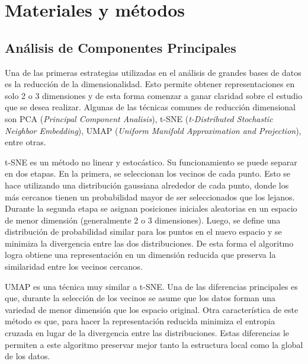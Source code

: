 \chapter{Materiales y métodos}
\label{cap1}
\section{Análisis de Componentes Principales}
\label{c11}
\onehalfspacing

Una de las primeras estrategias utilizadas en el análisis de grandes bases de datos es la reducción de la dimensionalidad. Esto permite obtener representaciones en solo 2 o 3 dimensiones y de esta forma comenzar a ganar claridad sobre el estudio que se desea realizar. Algunas de las técnicas comunes de reducción dimensional son PCA (\textit{Principal Component Analisis}), t-SNE (\textit{t-Distributed Stochastic Neighbor Embedding}), UMAP (\textit{Uniform Manifold Approximation and Projection}), entre otras.

t-SNE es un método no linear y estocástico. Su funcionamiento se puede separar en dos etapas. En la primera, se seleccionan los vecinos de cada punto. Esto se hace utilizando una distribución gaussiana alrededor de cada punto, donde los más cercanos tienen un probabilidad mayor de ser seleccionados que los lejanos. Durante la segunda etapa se asignan posiciones iniciales aleatorias en un espacio de menor dimensión (generalmente 2 o 3 dimensiones). Luego, se define una distribución de probabilidad similar para los puntos en el nuevo espacio y se minimiza la divergencia entre las dos distribuciones. De esta forma el algoritmo logra obtiene una representación en un dimensión reducida que preserva la similaridad entre los vecinos cercanos.

UMAP es una técnica muy similar a t-SNE. Una de las diferencias principales es que, durante la selección de los vecinos se asume que los datos forman una variedad de menor dimensión que los espacio original. Otra característica de este método es que, para hacer la representación reducida minimiza el entropia cruzada en lugar de la divergencia entre las distribuciones. Estas diferencias le permiten a este algoritmo preservar mejor tanto la estructura local como la global de los datos. 
